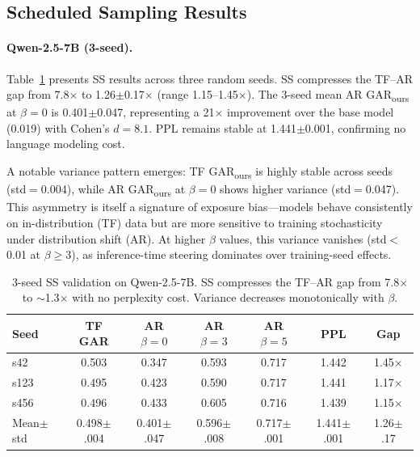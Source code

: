 \documentclass[11pt]{article}
\newcommand{\gar}{\textsc{GAR}}
\newcommand{\garours}{\textsc{GAR}\textsubscript{ours}}
\begin{document}
\subsection{Scheduled Sampling Results}

\paragraph{Qwen-2.5-7B (3-seed).} Table~\ref{tab:ss_seed} presents SS results across three random seeds. SS compresses the TF--AR gap from 7.8$\times$ to 1.26$\pm$0.17$\times$ (range 1.15--1.45$\times$). The 3-seed mean AR \garours{} at $\beta=0$ is 0.401$\pm$0.047, representing a 21$\times$ improvement over the base model (0.019) with Cohen's $d=8.1$. PPL remains stable at 1.441$\pm$0.001, confirming no language modeling cost.

A notable variance pattern emerges: TF \garours{} is highly stable across seeds (std$=$0.004), while AR \garours{} at $\beta=0$ shows higher variance (std$=$0.047). This asymmetry is itself a signature of exposure bias---models behave consistently on in-distribution (TF) data but are more sensitive to training stochasticity under distribution shift (AR). At higher $\beta$ values, this variance vanishes (std$<$0.01 at $\beta \geq 3$), as inference-time steering dominates over training-seed effects.

\begin{table}[t]
\centering
\small
\caption{3-seed SS validation on Qwen-2.5-7B. SS compresses the TF--AR gap from 7.8$\times$ to ${\sim}$1.3$\times$ with no perplexity cost. Variance decreases monotonically with $\beta$.}
\label{tab:ss_seed}
\begin{tabular}{lcccccc}
\toprule
\textbf{Seed} & \textbf{TF \gar{}} & \textbf{AR $\beta{=}0$} & \textbf{AR $\beta{=}3$} & \textbf{AR $\beta{=}5$} & \textbf{PPL} & \textbf{Gap} \\
\midrule
s42 & 0.503 & 0.347 & 0.593 & 0.717 & 1.442 & 1.45$\times$ \\
s123 & 0.495 & 0.423 & 0.590 & 0.717 & 1.441 & 1.17$\times$ \\
s456 & 0.496 & 0.433 & 0.605 & 0.716 & 1.439 & 1.15$\times$ \\
\midrule
Mean$\pm$std & 0.498$\pm$.004 & 0.401$\pm$.047 & 0.596$\pm$.008 & 0.717$\pm$.001 & 1.441$\pm$.001 & 1.26$\pm$.17 \\
\bottomrule
\end{tabular}
\end{table}
\end{document}
